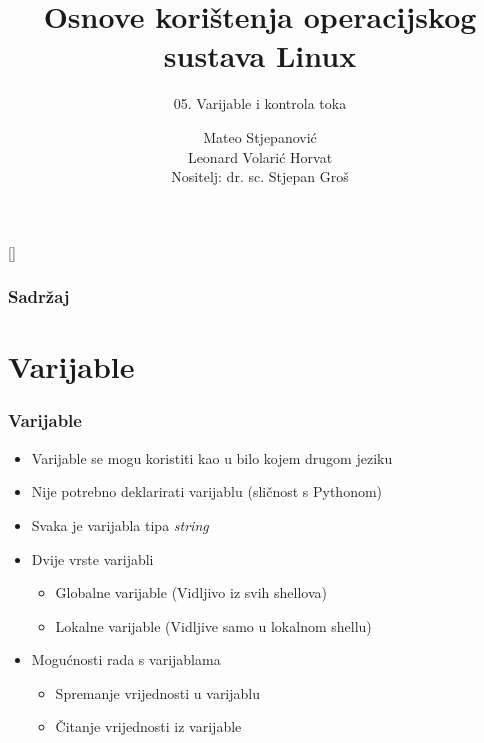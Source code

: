 \documentclass{beamer}
\title{Osnove korištenja operacijskog sustava Linux}
\subtitle{05. Varijable i kontrola toka}
\author[Mateo Stjepanović]{Mateo Stjepanović\\Leonard Volarić Horvat\\{\small Nositelj: dr. sc. Stjepan Groš}}
\institute[FER]{Sveučilište u Zagrebu \\
				Fakultet elektrotehnike i računarstva}
\date{\todayiso}
\begin{document}
{
[] %

\begin{frame}
\maketitle
\end{frame}
}

\begin{frame}
\frametitle{Sadržaj}
\tableofcontents
\end{frame}

\section{Varijable}
\begin{frame}[t]
\frametitle{Varijable}
\begin{itemize}
	\item Varijable se mogu koristiti kao u bilo kojem drugom jeziku
	\item Nije potrebno deklarirati varijablu (sličnost s Pythonom)
 	\item Svaka je varijabla tipa \textit{string}
	\item Dvije vrste varijabli
  	\begin{itemize}
  		\item Globalne varijable (Vidljivo iz svih shellova)
  		\item Lokalne varijable (Vidljive samo u lokalnom shellu)
  	\end{itemize}
  
	\item Mogućnosti rada s varijablama
 	\begin{itemize}
 		\item Spremanje vrijednosti u varijablu
		\item Čitanje vrijednosti iz varijable
	\end{itemize}
\end{itemize}
\end{frame}
\end{document}
